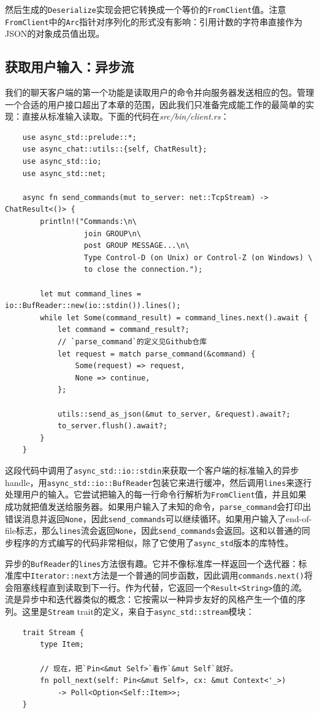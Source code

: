 然后生成的\texttt{Deserialize}实现会把它转换成一个等价的\texttt{FromClient}值。注意\texttt{FromClient}中的\texttt{Arc}指针对序列化的形式没有影响：引用计数的字符串直接作为JSON的对象成员值出现。

\subsection{获取用户输入：异步流}
我们的聊天客户端的第一个功能是读取用户的命令并向服务器发送相应的包。管理一个合适的用户接口超出了本章的范围，因此我们只准备完成能工作的最简单的实现：直接从标准输入读取。下面的代码在\emph{src/bin/client.rs}：
\begin{verbatim}
    use async_std::prelude::*;
    use async_chat::utils::{self, ChatResult};
    use async_std::io;
    use async_std::net;

    async fn send_commands(mut to_server: net::TcpStream) -> ChatResult<()> {
        println!("Commands:\n\
                  join GROUP\n\
                  post GROUP MESSAGE...\n\
                  Type Control-D (on Unix) or Control-Z (on Windows) \
                  to close the connection.");

        let mut command_lines = io::BufReader::new(io::stdin()).lines();
        while let Some(command_result) = command_lines.next().await {
            let command = command_result?;
            // `parse_command`的定义见Github仓库
            let request = match parse_command(&command) {
                Some(request) => request,
                None => continue,
            };

            utils::send_as_json(&mut to_server, &request).await?;
            to_server.flush().await?;
        }
    }
\end{verbatim}

这段代码中调用了\texttt{async\_std::io::stdin}来获取一个客户端的标准输入的异步handle，用\texttt{async\_std::io::BufReader}包装它来进行缓冲，然后调用\texttt{lines}来逐行处理用户的输入。它尝试把输入的每一行命令行解析为\texttt{FromClient}值，并且如果成功就把值发送给服务器。如果用户输入了未知的命令，\texttt{parse\_command}会打印出错误消息并返回\texttt{None}，因此\texttt{send\_commands}可以继续循环。如果用户输入了end-of-file标志，那么\texttt{lines}流会返回\texttt{None}，因此\texttt{send\_commands}会返回。这和以普通的同步程序的方式编写的代码非常相似，除了它使用了\texttt{async\_std}版本的库特性。

异步的\texttt{BufReader}的\texttt{lines}方法很有趣。它并不像标准库一样返回一个迭代器：标准库中\texttt{Iterator::next}方法是一个普通的同步函数，因此调用\texttt{commands.next()}将会阻塞线程直到读取到下一行。作为代替，它返回一个\texttt{Result<String>}值的\emph{流}。流是异步中和迭代器类似的概念：它按需以一种异步友好的风格产生一个值的序列。这里是\texttt{Stream} trait的定义，来自于\texttt{async\_std::stream}模块：
\begin{verbatim}
    trait Stream {
        type Item;

        // 现在，把`Pin<&mut Self>`看作`&mut Self`就好。
        fn poll_next(self: Pin<&mut Self>, cx: &mut Context<'_>)
            -> Poll<Option<Self::Item>>;
    }
\end{verbatim}

